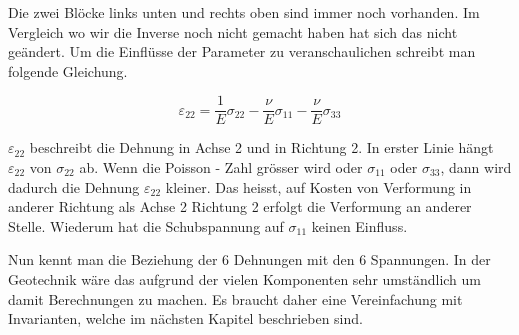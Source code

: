 Die zwei Blöcke links unten und rechts oben sind immer noch vorhanden.
Im Vergleich wo wir die Inverse noch nicht gemacht haben hat sich das nicht geändert.
Um die Einflüsse der Parameter zu veranschaulichen schreibt man folgende Gleichung.

\[
\varepsilon_{22}
=
\frac{1}{E}\sigma_{22} - \frac{\nu}{E}\sigma_{11} - \frac{\nu}{E}\sigma_{33}
\]

$\varepsilon_{22}$ beschreibt die Dehnung in Achse 2 und in Richtung 2.
In erster Linie hängt $\varepsilon_{22}$ von $\sigma_{22}$ ab.
Wenn die Poisson - Zahl grösser wird oder $\sigma_{11}$ oder $\sigma_{33}$, dann wird dadurch die Dehnung $\varepsilon_{22}$ kleiner.
Das heisst, auf Kosten von Verformung in anderer Richtung als Achse 2 Richtung 2 erfolgt die Verformung an anderer Stelle.
Wiederum hat die Schubspannung auf $\sigma_{11}$ keinen Einfluss.

Nun kennt man die Beziehung der 6 Dehnungen mit den 6 Spannungen.
In der Geotechnik wäre das aufgrund der vielen Komponenten sehr umständlich um damit Berechnungen zu machen.
Es braucht daher eine Vereinfachung mit Invarianten, welche im nächsten Kapitel beschrieben sind.

